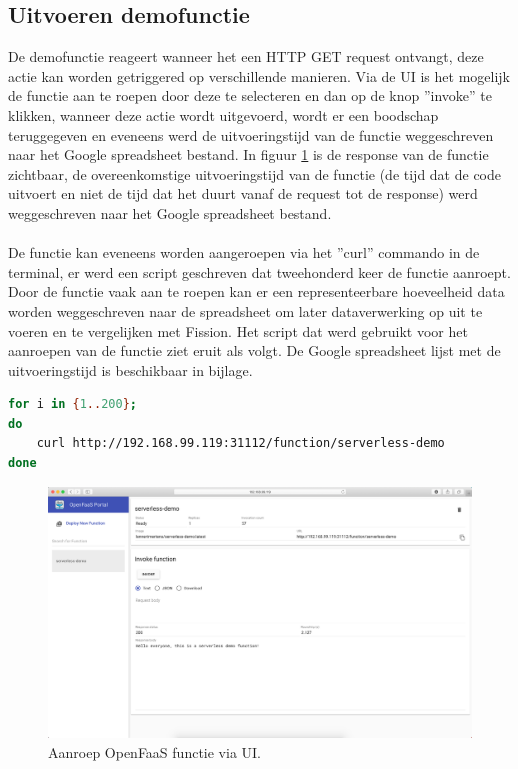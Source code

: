 \subsection{Uitvoeren demofunctie}
De demofunctie reageert wanneer het een HTTP GET request ontvangt, deze actie kan worden getriggered op verschillende manieren. Via de UI is het mogelijk de functie aan te roepen door deze te selecteren en dan op de knop ''invoke'' te klikken, wanneer deze actie wordt uitgevoerd, wordt er een boodschap teruggegeven en eveneens werd de uitvoeringstijd van de functie weggeschreven naar het Google spreadsheet bestand. In figuur \ref{fig:openfaas-functie-ui} is de response van de functie zichtbaar, de overeenkomstige uitvoeringstijd van de functie (de tijd dat de code uitvoert en niet de tijd dat het duurt vanaf de request tot de response) werd weggeschreven naar het Google spreadsheet bestand.
\\\\
De functie kan eveneens worden aangeroepen via het ''curl'' commando in de terminal, er werd een script geschreven dat tweehonderd keer de functie aanroept. Door de functie vaak aan te roepen kan er een representeerbare hoeveelheid data worden weggeschreven naar de spreadsheet om later dataverwerking op uit te voeren en te vergelijken met Fission. Het script dat werd gebruikt voor het aanroepen van de functie ziet eruit als volgt. De Google spreadsheet lijst met de uitvoeringstijd is beschikbaar in bijlage.

\begin{lstlisting}[language=bash]
for i in {1..200}; 
do
    curl http://192.168.99.119:31112/function/serverless-demo
done
\end{lstlisting}

\begin{figure}
    \includegraphics[width=1\textwidth]{img/openfaas-demo-ui.png}
    \caption{Aanroep OpenFaaS functie via UI.}
    \label{fig:openfaas-functie-ui}  
\end{figure}

